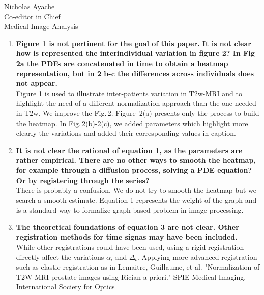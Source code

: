 \documentclass{letter}
\begin{document}
\begin{letter}{Nicholas Ayache \\ Co-editor in Chief \\ Medical Image Analysis}
\begin{enumerate}
{      demonstrated before any further classification step. The method
      could be useful when performing population analysis with the raw
      data, previous to defining a model.}\\
    We do not really see which analysis can be performed to evaluate
    the benefits of our methods before the classification step. A study of
    the variances with and without normalization could be carried out but
    an evaluation after classification seems equivalent and a good manner to
    evaluate the benefit of the normalization. In fact, this is the
    results reported in Fig.\,6(c).
  \item \textbf{Figure 1 is not pertinent for the goal of this paper.
      It is not clear how is represented the interindividual variation in
      figure 2?  In Fig 2a the PDFs are concatenated in time to obtain a
      heatmap representation, but in 2 b-c  the differences across
      individuals does not appear.}\\
    Figure 1 is used to illustrate inter-patients variation in T2w-MRI
    and to highlight the need of a different normalization approach
    than the one needed in T2w. We improve the Fig.\,2. Figure~2(a)
    presents only the process to build the
    heatmap. In Fig.\,2(b)-2(c), we added parameters which highlight
    more clearly the variations and added their corresponding values
    in caption.
  \item \textbf{It is not clear the rational of equation 1, as the
      parameters are rather empirical.  There are no other ways to
      smooth the heatmap, for example through a diffusion process,
      solving a PDE equation? Or by registering through the series?}\\
    There is probably a confusion. We do not try to smooth the heatmap
    but we search a smooth estimate. Equation 1 represents the weight
    of the graph and is a standard way to formalize graph-based
    problem in image processing.
  \item \textbf{The theoretical foundations of equation 3 are not
      clear. Other registration methods for time signas may have been
      included.}\\
    While other registrations could have been used,
    using a rigid registration directly affect the variations
    $\alpha_i$ and $\Delta_t$. Applying more advanced registration
    such as elastic registration as in Lemaitre, Guillaume, et
    al. "Normalization of T2W-MRI prostate images using Rician a
    priori." SPIE Medical Imaging. International Society for Optics

\end{enumerate}
\end{letter}
\end{document}
